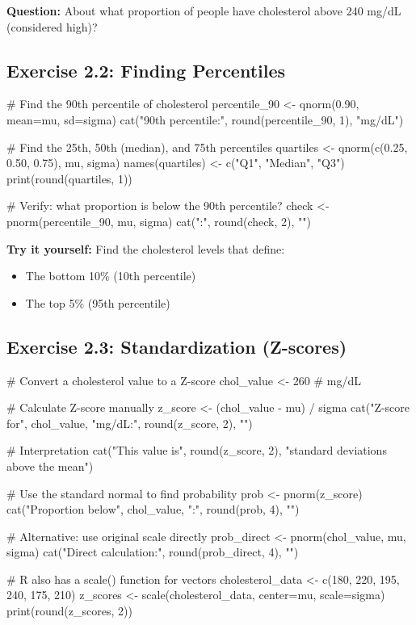\documentclass[11pt]{article}
\begin{document}
\textbf{Question:} About what proportion of people have cholesterol above 240 mg/dL (considered high)?

\vspace{1cm}

\subsection{Exercise 2.2: Finding Percentiles}

\begin{rcode}
# Find the 90th percentile of cholesterol
percentile_90 <- qnorm(0.90, mean=mu, sd=sigma)
cat("90th percentile:", round(percentile_90, 1), "mg/dL\n")

# Find the 25th, 50th (median), and 75th percentiles
quartiles <- qnorm(c(0.25, 0.50, 0.75), mu, sigma)
names(quartiles) <- c("Q1", "Median", "Q3")
print(round(quartiles, 1))

# Verify: what proportion is below the 90th percentile?
check <- pnorm(percentile_90, mu, sigma)
cat("\nVerification:", round(check, 2), "\n")
\end{rcode}

\textbf{Try it yourself:} Find the cholesterol levels that define:
\begin{itemize}
\item The bottom 10\% (10th percentile)
\item The top 5\% (95th percentile)
\end{itemize}

\vspace{1.5cm}

\subsection{Exercise 2.3: Standardization (Z-scores)}

\begin{rcode}
# Convert a cholesterol value to a Z-score
chol_value <- 260   # mg/dL

# Calculate Z-score manually
z_score <- (chol_value - mu) / sigma
cat("Z-score for", chol_value, "mg/dL:", round(z_score, 2), "\n")

# Interpretation
cat("This value is", round(z_score, 2),
    "standard deviations above the mean\n")

# Use the standard normal to find probability
prob <- pnorm(z_score)
cat("Proportion below", chol_value, ":", round(prob, 4), "\n")

# Alternative: use original scale directly
prob_direct <- pnorm(chol_value, mu, sigma)
cat("Direct calculation:", round(prob_direct, 4), "\n")

# R also has a scale() function for vectors
cholesterol_data <- c(180, 220, 195, 240, 175, 210)
z_scores <- scale(cholesterol_data, center=mu, scale=sigma)
print(round(z_scores, 2))
\end{rcode}
\end{document}
